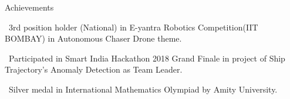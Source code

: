 \documentclass{resume} %
\begin{document}
\begin{rSection}{Achievements}
	\itemsep -2pt
	\item \textbullet \ 3rd position holder (National) in E-yantra Robotics Competition(IIT BOMBAY)
	in Autonomous Chaser Drone theme.
	\item \textbullet \ Participated in Smart India Hackathon 2018 Grand Finale in project of Ship Trajectory's Anomaly Detection as Team Leader.
	\item \textbullet \ Silver medal in International Mathematics Olympiad by Amity University.
\end{rSection}
\end{document}
